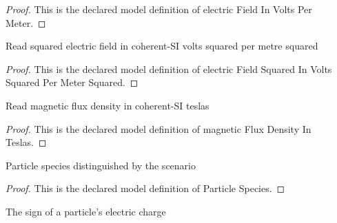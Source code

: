 \begin{proof}
  This is the declared model definition of electric Field In Volts Per Meter.
\end{proof}
\begin{definition}
  \label{def:physics:phyx-mini-0955:phyxminiproblems-problemphyxmini0955-electricfieldsquaredinvoltssquaredpermetersquared}
  Read squared electric field in coherent-SI volts squared per metre squared
\end{definition}
\begin{proof}
  This is the declared model definition of electric Field Squared In Volts Squared Per Meter Squared.
\end{proof}
\begin{definition}
  \label{def:physics:phyx-mini-0955:phyxminiproblems-problemphyxmini0955-magneticfluxdensityinteslas}
  Read magnetic flux density in coherent-SI teslas
\end{definition}
\begin{proof}
  This is the declared model definition of magnetic Flux Density In Teslas.
\end{proof}
\begin{definition}
  \label{def:physics:phyx-mini-0955:phyxminiproblems-problemphyxmini0955-particlespecies}
  Particle species distinguished by the scenario
\end{definition}
\begin{proof}
  This is the declared model definition of Particle Species.
\end{proof}
\begin{definition}
  \label{def:physics:phyx-mini-0955:phyxminiproblems-problemphyxmini0955-chargesign}
  The sign of a particle's electric charge
\end{definition}
